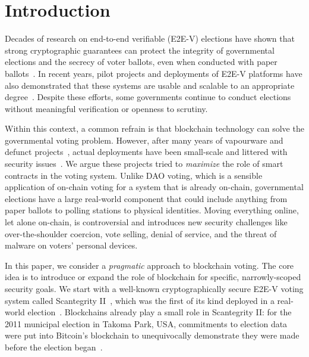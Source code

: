 \section{Introduction}

Decades of research on end-to-end verifiable (E2E-V) elections have shown that strong cryptographic guarantees can protect the integrity of governmental elections and the secrecy of voter ballots, even when conducted with paper ballots~\cite{HR16}.
In recent years, pilot projects and deployments of E2E-V platforms have also demonstrated that these systems are usable and scalable to an appropriate degree~\cite{AMPQ09,CCC+10,BBB+13,CRST15}.
Despite these efforts, some governments continue to conduct elections without meaningful verification or openness to scrutiny.


Within this context, a common refrain is that blockchain technology can solve the governmental voting problem. However, after many years of vapourware and defunct projects~\cite{KSM21,Ern25}, actual deployments have been small-scale and littered with security issues~\cite{SKW20,GG20}. We argue these projects tried to \textit{maximize} the role of smart contracts in the voting system. Unlike DAO voting, which is a sensible application of on-chain voting for a system that is already on-chain, governmental elections have a large real-world component that could include anything from paper ballots to polling stations to physical identities. Moving everything online, let alone on-chain, is controversial and introduces new security challenges like over-the-shoulder coercion, vote selling, denial of service, and the threat of malware on voters' personal devices.

In this paper, we consider a \textit{pragmatic} approach to blockchain voting. The core idea is to introduce or expand the role of blockchain for specific, narrowly-scoped security goals. We start with a well-known cryptographically secure E2E-V voting system called Scantegrity II~\cite{CCC+08}, which was the first of its kind deployed in a real-world election~\cite{CCC+10}. Blockchains already play a small role in Scantegrity II: for the 2011 municipal election in Takoma Park, USA, commitments to election data were put into Bitcoin's blockchain to unequivocally demonstrate they were made before the election began~\cite{CE12}.

